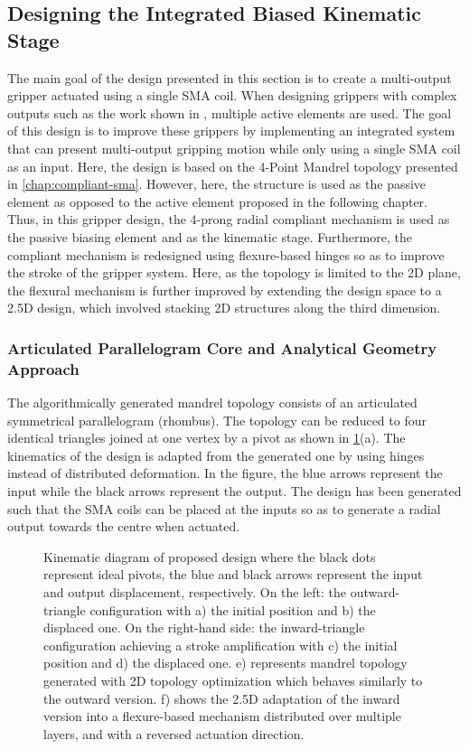 \subsection{Designing the Integrated Biased Kinematic Stage}
The main goal of the design presented in this section is to create a multi-output gripper actuated using a single SMA coil. When designing grippers with complex outputs such as the work shown in \todocite, multiple active elements are used. The goal of this design is to improve these grippers by implementing an integrated system that can present multi-output gripping motion while only using a single SMA coil as an input. Here, the design is based on the 4-Point Mandrel topology presented in \cref{chap:compliant-sma}. However, here, the structure is used as the passive element as opposed to the active element proposed in the following chapter. Thus, in this gripper design, the 4-prong radial compliant mechanism is used as the passive biasing element and as the kinematic stage. Furthermore, the compliant mechanism is redesigned using flexure-based hinges so as to improve the stroke of the gripper system. Here, as the topology is limited to the 2D plane, the flexural mechanism is further improved by extending the design space to a 2.5D design, which involved stacking 2D structures along the third dimension.
\subsubsection{Articulated Parallelogram Core and Analytical Geometry Approach}
The algorithmically generated mandrel topology consists of an articulated symmetrical parallelogram (rhombus). The topology can be reduced to four identical triangles joined at one vertex by a pivot as shown in \cref{fig:mandrel-kinematic}(a). The kinematics of the design is adapted from the generated one by using hinges instead of distributed deformation. In the figure, the blue arrows represent the input while the black arrows represent the output. The design has been generated such that the SMA coils can be placed at the inputs so as to generate a radial output towards the centre when actuated.

\begin{figure}[hbt!] %
  \centering
  \resizebox{\textwidth}{!}{}
  \caption{Kinematic diagram of proposed design where the black dots represent ideal pivots, the blue and black arrows represent the input and output displacement, respectively. On the left: the outward-triangle configuration with a) the initial position and b) the displaced one. On the right-hand side: the inward-triangle configuration achieving a stroke amplification with c) the initial position and d) the displaced one. e) represents mandrel topology generated with 2D topology optimization which behaves similarly to the outward version. f) shows the 2.5D adaptation of the inward version into a flexure-based mechanism distributed over multiple layers, and with a reversed actuation direction.}
  \label{fig:mandrel-kinematic}
\end{figure}

